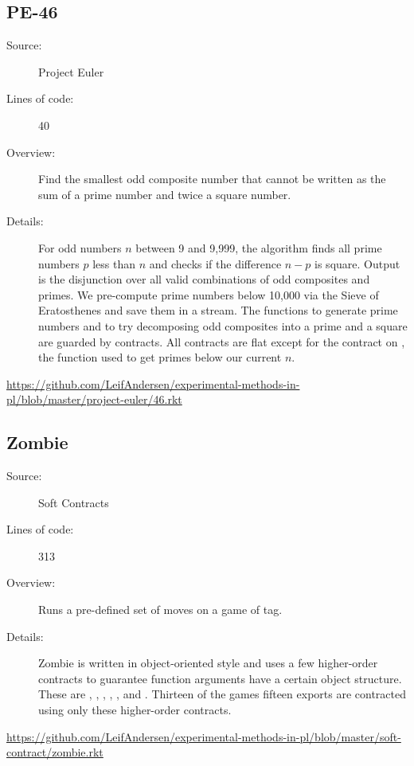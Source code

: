 \subsection*{PE-46~\hrulefill}
\begin{description}
\item[Source:] Project Euler
\item[Lines of code:] 40
\item[Overview:]
  Find the smallest odd composite number that cannot be written as the sum of a prime number and twice a square number.
\item[Details:] 
  For odd numbers $n$ between 9 and 9,999, the algorithm finds all prime numbers $p$ less than $n$ and checks if the difference $n - p$ is square.
  Output is the  disjunction over all valid combinations of odd composites and primes.
  We pre-compute prime numbers below 10,000 via the Sieve of Eratosthenes and save them in a stream.
  The functions to generate prime numbers and to try decomposing odd composites into a prime and a square are guarded by contracts.
  All contracts are flat except for the contract on , the function used to get primes below our current $n$.
\end{description}
\url{https://github.com/LeifAndersen/experimental-methods-in-pl/blob/master/project-euler/46.rkt}

\subsection*{Zombie~\hrulefill}
\begin{description}
\item[Source:] Soft Contracts
\item[Lines of code:] 313
\item[Overview:]
  Runs a pre-defined set of moves on a game of tag.
\item[Details:]
  Zombie is written in object-oriented style and uses a few higher-order contracts to guarantee function arguments have a certain object structure.
  These are , , , , , and .
  Thirteen of the games fifteen exports are contracted using only these higher-order contracts.
\end{description}
\url{https://github.com/LeifAndersen/experimental-methods-in-pl/blob/master/soft-contract/zombie.rkt}

